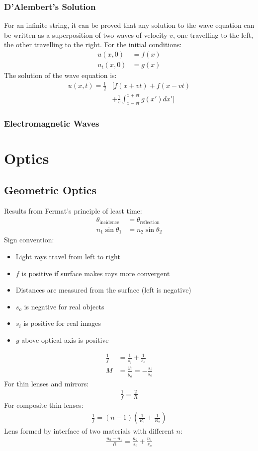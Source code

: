 \documentclass[11pt]{article}
\begin{document}
\begin{multicols*}{3}
\subsubsection{D'Alembert's Solution}
For an infinite string, it can be proved that any solution to the wave equation can be written as a superposition of two waves of velocity $v$, one travelling to the left, the other travelling to the right. For the initial conditions:
\begin{align*}
u(x, 0) &= f(x) \\
u_t(x, 0) &= g(x)
\end{align*}
The solution of the wave equation is:
\begin{align*}
u(x, t) = \frac{1}{2} &\bigg[ f(x+vt) + f(x-vt)  \\
&+ \frac{1}{v}\int_{x-vt}^{x+vt}g(x') dx' \bigg]
\end{align*}
\subsubsection{Electromagnetic Waves}

\section{Optics}
\subsection{Geometric Optics}
Results from Fermat's principle of least time:
\begin{align*}
\theta_\text{incidence}&=\theta_\text{reflection} \\
n_1\sin{\theta_1}&=n_2 \sin{\theta_2}
\end{align*}
Sign convention:
\begin{itemize}
\item Light rays travel from left to right
\item $f$ is positive if surface makes rays more convergent 
\item Distances are measured from the surface (left is negative)
\item $s_o$ is negative for real objects
\item $s_i$ is positive for real images
\item $y$ above optical axis is positive
\end{itemize}
\begin{align*}
\frac{1}{f}&=\frac{1}{s_{i}}+\frac{1}{s_{o}} \\
M&=\frac{y_i}{y_o}=-\frac{s_i}{s_o}
\end{align*}
For thin lenses and mirrors:
\begin{align*}
\frac{1}{f} = \frac{2}{R}
\end{align*}
For composite thin lenses:
\begin{align*}
\frac{1}{f} = (n-1)\left(\frac{1}{R_1} + \frac{1}{R_2}\right)
\end{align*}
Lens formed by interface of two materials with different $n$:
\begin{align*}
\frac{n_2-n_1}{R} = \frac{n_2}{s_i} + \frac{n_1}{s_o}
\end{align*}

\end{multicols*}
\end{document}
